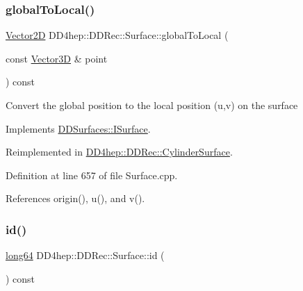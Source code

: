 \hypertarget{class_d_d4hep_1_1_d_d_rec_1_1_surface_ad7ea93419ec45ad4491c84065bd930aa}{}\label{class_d_d4hep_1_1_d_d_rec_1_1_surface_ad7ea93419ec45ad4491c84065bd930aa} 
\subsubsection{\texorpdfstring{global\+To\+Local()}{globalToLocal()}}
{\footnotesize\ttfamily \hyperlink{class_d_d_surfaces_1_1_vector2_d}{Vector2D} D\+D4hep\+::\+D\+D\+Rec\+::\+Surface\+::global\+To\+Local (\begin{DoxyParamCaption}\item[{const \hyperlink{class_d_d_surfaces_1_1_vector3_d}{Vector3D} \&}]{point }\end{DoxyParamCaption}) const\hspace{0.3cm}{\ttfamily [virtual]}}

Convert the global position to the local position (u,v) on the surface 

Implements \hyperlink{class_d_d_surfaces_1_1_i_surface_a0d6db86d4871584a9e72ac6018229737}{D\+D\+Surfaces\+::\+I\+Surface}.



Reimplemented in \hyperlink{class_d_d4hep_1_1_d_d_rec_1_1_cylinder_surface_a020b7f61ba490d05d9473250714d6d5f}{D\+D4hep\+::\+D\+D\+Rec\+::\+Cylinder\+Surface}.



Definition at line 657 of file Surface.\+cpp.



References origin(), u(), and v().

\hypertarget{class_d_d4hep_1_1_d_d_rec_1_1_surface_a5287eb53d729f58db5c14b6db98b1db7}{}\label{class_d_d4hep_1_1_d_d_rec_1_1_surface_a5287eb53d729f58db5c14b6db98b1db7} 
\subsubsection{\texorpdfstring{id()}{id()}}
{\footnotesize\ttfamily \hyperlink{namespace_d_d_surfaces_ab6b3da366f31f80aec56447ac4442e78}{long64} D\+D4hep\+::\+D\+D\+Rec\+::\+Surface\+::id (\begin{DoxyParamCaption}{ }\end{DoxyParamCaption}) const\hspace{0.3cm}{\ttfamily [virtual]}}



